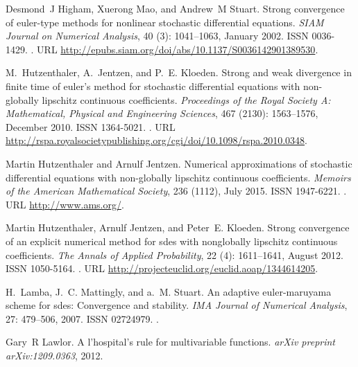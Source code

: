 \documentclass[sort&compress, preprint]{elsarticle}
\theoremstyle{definition}
\theoremstyle{plain}%
\theoremstyle{remark}
\begin{document}
\begin{thebibliography}{17}
Desmond~J Higham, Xuerong Mao, and Andrew~M Stuart.
\newblock Strong convergence of euler-type methods for nonlinear stochastic
  differential equations.
\newblock \emph{SIAM Journal on Numerical Analysis}, 40 (3):
  1041--1063, January 2002.
\newblock ISSN 0036-1429.
\newblock {}.
\newblock URL \url{http://epubs.siam.org/doi/abs/10.1137/S0036142901389530}.

M.~Hutzenthaler, A.~Jentzen, and P.~E. Kloeden.
\newblock Strong and weak divergence in finite time of euler's method for
  stochastic differential equations with non-globally lipschitz continuous
  coefficients.
\newblock \emph{Proceedings of the Royal Society A: Mathematical, Physical and
  Engineering Sciences}, 467 (2130): 1563--1576, December
  2010.
\newblock ISSN 1364-5021.
\newblock {}.
\newblock URL
  \url{http://rspa.royalsocietypublishing.org/cgi/doi/10.1098/rspa.2010.0348}.

Martin Hutzenthaler and Arnulf Jentzen.
\newblock Numerical approximations of stochastic differential equations with
  non-globally lipschitz continuous coefficients.
\newblock \emph{Memoirs of the American Mathematical Society}, 236
  (1112), July 2015.
\newblock ISSN 1947-6221.
\newblock {}.
\newblock URL \url{http://www.ams.org/}.

Martin Hutzenthaler, Arnulf Jentzen, and Peter~E. Kloeden.
\newblock Strong convergence of an explicit numerical method for sdes with
  nonglobally lipschitz continuous coefficients.
\newblock \emph{The Annals of Applied Probability}, 22 (4):
  1611--1641, August 2012.
\newblock ISSN 1050-5164.
\newblock {}.
\newblock URL \url{http://projecteuclid.org/euclid.aoap/1344614205}.

H.~Lamba, J.~C. Mattingly, and a.~M. Stuart.
\newblock An adaptive euler-maruyama scheme for sdes: Convergence and
  stability.
\newblock \emph{IMA Journal of Numerical Analysis}, 27: 479--506,
  2007.
\newblock ISSN 02724979.
\newblock {}.

Gary~R Lawlor.
\newblock A l'hospital's rule for multivariable functions.
\newblock \emph{arXiv preprint arXiv:1209.0363}, 2012.


\end{thebibliography}
\end{document}

